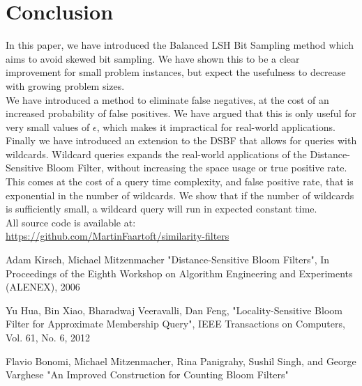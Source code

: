 \documentclass[a4paper,11pt]{article}
\begin{document}
\section{Conclusion}

In this paper, we have introduced the Balanced LSH Bit Sampling method which aims to avoid skewed bit sampling. We have shown this to be a clear improvement for small problem instances, but expect the usefulness to decrease with growing problem sizes.\\

We have introduced a method to eliminate false negatives, at the cost of an increased probability of false positives. We have argued that this is only useful for very small values of $\epsilon$, which makes it impractical for real-world applications.\\

Finally we have introduced an extension to the DSBF that allows for queries with wildcards. Wildcard queries expands the real-world applications of the Distance-Sensitive Bloom Filter, without increasing the space usage or true positive rate. This comes at the cost of a query time complexity, and false positive rate, that is exponential in the number of wildcards. We show that if the number of wildcards is sufficiently small, a wildcard query will run in expected constant time.\\

All source code is available at: \\\url{https://github.com/MartinFaartoft/similarity-filters}

\newpage

\begin{thebibliography}{}

Adam Kirsch, Michael Mitzenmacher
"Distance-Sensitive Bloom Filters", In Proceedings of the Eighth Workshop on Algorithm Engineering and Experiments (ALENEX), 2006

Yu Hua, Bin Xiao, Bharadwaj Veeravalli, Dan Feng, "Locality-Sensitive Bloom Filter for Approximate Membership Query", IEEE Transactions on Computers, Vol. 61, No. 6, 2012


Flavio Bonomi, Michael Mitzenmacher, Rina Panigrahy, Sushil Singh, and George Varghese
"An Improved Construction for Counting Bloom Filters"

\end{thebibliography}
\end{document}
